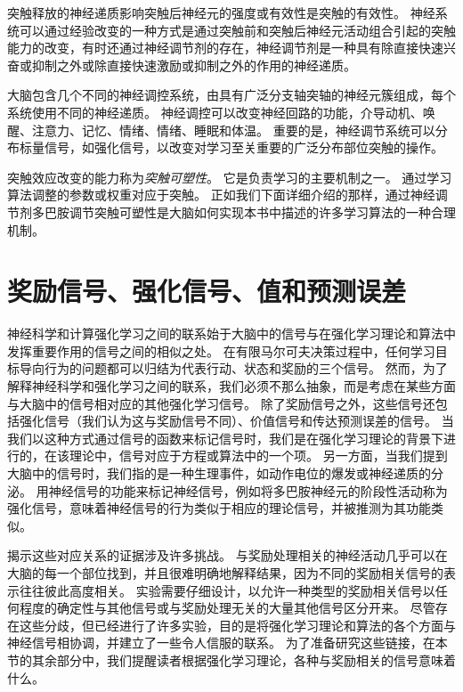 突触释放的神经递质影响突触后神经元的强度或有效性是突触的有效性。
神经系统可以通过经验改变的一种方式是通过突触前和突触后神经元活动组合引起的突触能力的改变，有时还通过神经调节剂的存在，神经调节剂是一种具有除直接快速兴奋或抑制之外或除直接快速激励或抑制之外的作用的神经递质。


大脑包含几个不同的神经调控系统，由具有广泛分支轴突轴的神经元簇组成，每个系统使用不同的神经递质。
神经调控可以改变神经回路的功能，介导动机、唤醒、注意力、记忆、情绪、情绪、睡眠和体温。
重要的是，神经调节系统可以分布标量信号，如强化信号，以改变对学习至关重要的广泛分布部位突触的操作。


突触效应改变的能力称为\textit{突触可塑性}。
它是负责学习的主要机制之一。
通过学习算法调整的参数或权重对应于突触。
正如我们下面详细介绍的那样，通过神经调节剂多巴胺调节突触可塑性是大脑如何实现本书中描述的许多学习算法的一种合理机制。


\section{奖励信号、强化信号、值和预测误差} \label{sec:reward_signals}

神经科学和计算强化学习之间的联系始于大脑中的信号与在强化学习理论和算法中发挥重要作用的信号之间的相似之处。
在有限马尔可夫决策过程中，任何学习目标导向行为的问题都可以归结为代表行动、状态和奖励的三个信号。
然而，为了解释神经科学和强化学习之间的联系，我们必须不那么抽象，而是考虑在某些方面与大脑中的信号相对应的其他强化学习信号。
除了奖励信号之外，这些信号还包括强化信号（我们认为这与奖励信号不同）、价值信号和传达预测误差的信号。
当我们以这种方式通过信号的函数来标记信号时，我们是在强化学习理论的背景下进行的，在该理论中，信号对应于方程或算法中的一个项。
另一方面，当我们提到大脑中的信号时，我们指的是一种生理事件，如动作电位的爆发或神经递质的分泌。
用神经信号的功能来标记神经信号，例如将多巴胺神经元的阶段性活动称为强化信号，意味着神经信号的行为类似于相应的理论信号，并被推测为其功能类似。



揭示这些对应关系的证据涉及许多挑战。
与奖励处理相关的神经活动几乎可以在大脑的每一个部位找到，并且很难明确地解释结果，因为不同的奖励相关信号的表示往往彼此高度相关。
实验需要仔细设计，以允许一种类型的奖励相关信号以任何程度的确定性与其他信号或与奖励处理无关的大量其他信号区分开来。
尽管存在这些分歧，但已经进行了许多实验，目的是将强化学习理论和算法的各个方面与神经信号相协调，并建立了一些令人信服的联系。
为了准备研究这些链接，在本节的其余部分中，我们提醒读者根据强化学习理论，各种与奖励相关的信号意味着什么。


